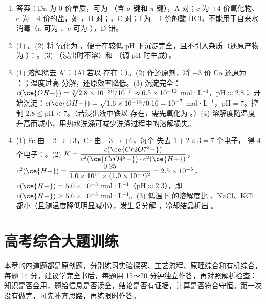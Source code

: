 \documentclass[UTF8,a4paper,zihao=5,oneside,openany,fontset=none]{ctexbook}
\def\heiti{\CJKfamily{zhhei}}
\def\sigma{σ}\def\pi{π}\def\Delta{Δ}\def\alpha{α}\def\beta{β}%
\newenvironment{jiexilist}{\small\begin{enumerate}[label={\textbf{\arabic*}.},leftmargin=1.6em,itemsep=0.3em,topsep=0.2em]}{\end{enumerate}}
\newcommand{\ans}[1]{{\heiti 答案：}#1\quad}
\begin{document}
\begin{jiexilist}
\item \ans{D}a 为 0 价单质，可为 （含 $\sigma$ 键和 $\pi$ 键），A 对；c 为 $+4$ 价氧化物、e 为 $+4$ 价的盐，如 ，B 对；，C 对；f 为 $-1$ 价的酸 HCl，不能用于自来水消毒（a 可为 、c 可为 ），D 错。
\item (1) 。(2) 将  氧化为 ，便于在较低 pH 下沉淀完全，且不引入杂质（还原产物为 ）：。(3) （浸出时不溶）和 （调 pH 时生成）。
\item (1) 溶解除去 Al：（Al 若以  存在：）。(2) 作还原剂，将 $+3$ 价 Co 还原为 ：；温度过高  分解，还原效率降低。(3)  沉淀完全：$c(\ce{OH-})=\sqrt[3]{2.8\times10^{-39}/10^{-5}}\approx6.5\times10^{-12}$ mol·L$^{-1}$，pH$\approx2.8$； 开始沉淀：$c(\ce{OH-})=\sqrt{1.6\times10^{-15}/0.16}=10^{-7}$ mol·L$^{-1}$，pH$=7$。控制 $2.8\le$pH$<7$。（若浸出液中铁以  存在，需先氧化为 。）(4)  溶解度随温度升高而减小，用热水洗涤可减少洗涤过程中的溶解损失。
\item (1) Fe 由 $+2\to+3$，Cr 由 $+3\to+6$，每个  失去 $1+2\times3=7$ 个电子， 得 4 个电子：。(2) $K=\dfrac{c(\ce{Cr2O7^2-})}{c^2(\ce{CrO4^2-})\cdot c^2(\ce{H+})}$，$c^2(\ce{H+})=\dfrac{0.25}{1.0\times10^{14}\times(1.0\times10^{-5})^2}=2.5\times10^{-5}$，$c(\ce{H+})=5.0\times10^{-3}$ mol·L$^{-1}$（pH$\approx2.3$），即 $c(\ce{H+})\ge5.0\times10^{-3}$ mol·L$^{-1}$。(3) 低温下  的溶解度比 、NaCl、KCl 都小（且随温度降低明显减小），发生复分解 ，冷却结晶析出 。
\end{jiexilist}
\chapter{高考综合大题训练}

本章的四道题都是原创题，分别练习实验探究、工艺流程、原理综合和有机综合，每题 14 分。建议学完全书后，每题用 15～20 分钟独立作答，再对照解析检查：知识是否会用，题给信息是否读全，结论是否有证据，计算是否符合守恒。第一次没有做完，可先补齐思路，再练限时作答。
\end{document}
